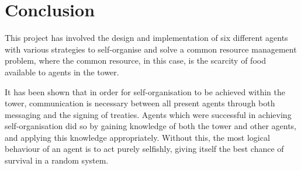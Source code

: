 \chapter{Conclusion}\label{conclusion}

This project has involved the design and implementation of six different agents with various strategies to self-organise and solve a common resource management problem, where the common resource, in this case, is the scarcity of food available to agents in the tower.

It has been shown that in order for self-organisation to be achieved within the tower, communication is necessary between all present agents through both messaging and the signing of treaties. Agents which were successful in achieving self-organisation did so by gaining knowledge of both the tower and other agents, and applying this knowledge appropriately. Without this, the most logical behaviour of an agent is to act purely selfishly, giving itself the best chance of survival in a random system.